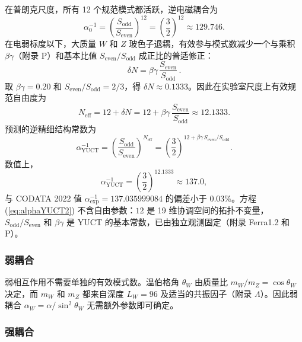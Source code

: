 \documentclass[12pt,a4paper]{article}
\begin{document}
	在普朗克尺度，所有 12 个规范模式都活跃，逆电磁耦合为
	\begin{equation}
		\alpha_0^{-1} = \left(\frac{S_{\mathrm{odd}}}{S_{\mathrm{even}}}\right)^{\!12}
		= \left(\frac{3}{2}\right)^{\!12} \approx 129.746 .
	\end{equation}
	在电弱标度以下，大质量 \(W\) 和 \(Z\) 玻色子退耦，有效参与模式数减少一个与乘积 \(\beta\gamma\)（附录 P）和基本比值 \(S_{\mathrm{even}}/S_{\mathrm{odd}}\) 成正比的普适修正：
	\begin{equation}
		\delta N = \beta\gamma\,\frac{S_{\mathrm{even}}}{S_{\mathrm{odd}}}\, .
		\label{eq:deltaN2}
	\end{equation}
	取 \(\beta\gamma = 0.20\) 和 \(S_{\mathrm{even}}/S_{\mathrm{odd}} = 2/3\)，得 \(\delta N \approx 0.1333\)。因此在实验室尺度上有效规范自由度为
	\begin{equation}
		N_{\mathrm{eff}} = 12 + \delta N = 12 + \beta\gamma\,\frac{S_{\mathrm{even}}}{S_{\mathrm{odd}}}
		\approx 12.1333 .
	\end{equation}
	预测的逆精细结构常数为
	\begin{equation}
		\boxed{\alpha^{-1}_{\mathrm{YUCT}} =
			\left(\frac{S_{\mathrm{odd}}}{S_{\mathrm{even}}}\right)^{\!N_{\mathrm{eff}}}
			= \left(\frac{3}{2}\right)^{\!12 + \beta\gamma\,S_{\mathrm{even}}/S_{\mathrm{odd}}} } .
		\label{eq:alphaYUCT2}
	\end{equation}
	数值上，
	\[
	\alpha^{-1}_{\mathrm{YUCT}} = \left(\frac{3}{2}\right)^{\!12.1333} \approx 137.0 ,
	\]
	与 CODATA 2022 值 \(\alpha^{-1}_{\mathrm{exp}} = 137.035999084\) 的偏差小于 \(0.03\%\)。方程 (\ref{eq:alphaYUCT2}) 不含自由参数：\(12\) 是 19 维协调空间的拓扑不变量，\(S_{\mathrm{odd}}/S_{\mathrm{even}}\) 和 \(\beta\gamma\) 是 YUCT 的基本常数，已由独立观测固定（附录 Ferra1.2 和 P）。
	
	\subsubsection{弱耦合}
	
	弱相互作用不需要单独的有效模式数。温伯格角 \(\theta_W\) 由质量比 \(m_W/m_Z = \cos\theta_W\) 决定，而 \(m_W\) 和 \(m_Z\) 都来自深度 \(L_W = 96\) 及适当的共振因子（附录 \(\Lambda\)）。因此弱耦合 \(\alpha_W = \alpha/\sin^2\theta_W\) 无需额外参数即可确定。
	
	\subsubsection{强耦合}
	
\end{document}
